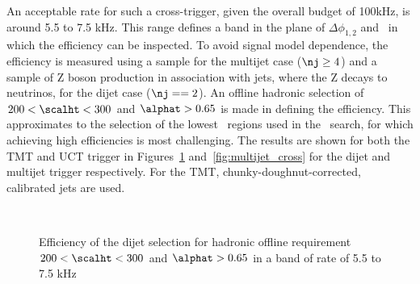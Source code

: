 An acceptable rate for such a cross-trigger, given the overall budget of 100kHz, is 
around 5.5 to 7.5 kHz. This range defines a band in the plane of $\Delta\phi_{1,2}$
and \scalht~in which the efficiency can be inspected. To avoid signal model dependence, the 
efficiency is measured using a \ttbar sample for the multijet case ($\nj \ge 4$) and a sample  
of Z boson production in association with jets, where the Z decays to neutrinos, for the 
dijet case ($\nj == 2$). An offline hadronic selection of $200 < \scalht < 300$ 
and $\alphat > 0.65$ is made in defining the efficiency. This approximates to the selection
of the lowest \scalht~regions used in the \alphat~search, for which achieving high efficiencies is most challenging.
The results are shown for both the TMT and UCT trigger in Figures~\ref{fig:dijet_cross} and~\ref{fig:multijet_cross} 
for the dijet and multijet trigger respectively. For the TMT, chunky-doughnut-corrected, calibrated jets are used.

\begin{figure}
\centering
	~
	\caption{Efficiency of the dijet selection for hadronic offline requirement $200 < \scalht < 300$ and $\alphat > 0.65$
	in a band of rate of 5.5 to 7.5 kHz}
	    \label{fig:dijet_cross}
\end{figure}

